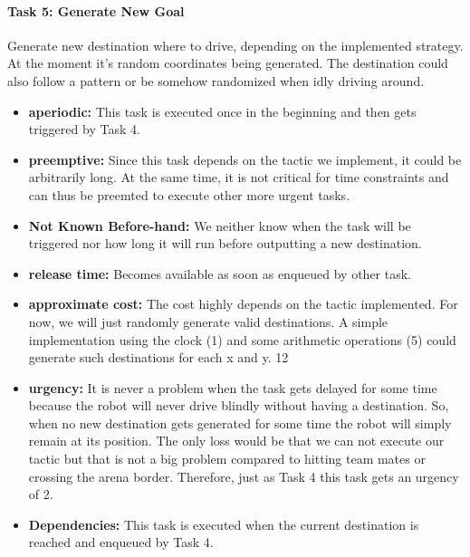 \documentclass[12pt]{article}
\begin{document}
\paragraph{Task 5: Generate New Goal}
Generate new destination where to drive, depending on the implemented strategy. At the moment it's random coordinates being generated. The destination could also follow a pattern or be somehow randomized when idly driving around.
  \begin{itemize}
	\item \textbf{aperiodic:} This task is executed once in the beginning and then gets triggered by Task 4.
	\item \textbf{preemptive:} Since this task depends on the tactic we implement, it could be arbitrarily long. At the same time, it is not critical for time constraints and can thus be preemted to execute other more urgent tasks.
  	\item \textbf{Not Known Before-hand:} We neither know when the task will be triggered nor how long it will run before outputting a new destination.
  	\item \textbf{release time:} Becomes available as soon as enqueued by other task.
  	\item \textbf{approximate cost:} The cost highly depends on the tactic implemented. For now, we will just randomly generate valid destinations. A simple implementation using the clock (1) and some arithmetic operations (5) could generate such destinations for each x and y. 12
  	\item \textbf{urgency:} It is never a problem when the task gets delayed for some time because the robot will never drive blindly without having a destination. So, when no new destination gets generated for some time the robot will simply remain at its position. The only loss would be that we can not execute our tactic but that is not a big problem compared to hitting team mates or crossing the arena border. Therefore, just as Task 4 this task gets an urgency of 2.
  	\item \textbf{Dependencies:} This task is executed when the current destination is reached and enqueued by Task 4.
   	\end{itemize}
\end{document}
